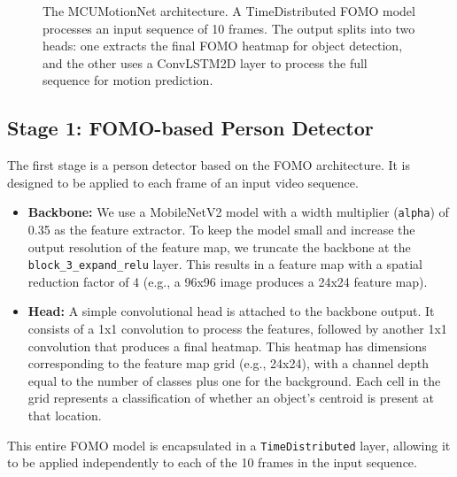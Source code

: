 \documentclass{article}
\begin{document}
\begin{figure}[h!]
{
}
\caption{The MCUMotionNet architecture. A TimeDistributed FOMO model processes an input sequence of 10 frames. The output splits into two heads: one extracts the final FOMO heatmap for object detection, and the other uses a ConvLSTM2D layer to process the full sequence for motion prediction.}
\label{fig:architecture}
\end{figure}

\subsection{Stage 1: FOMO-based Person Detector}
The first stage is a person detector based on the FOMO architecture. It is designed to be applied to each frame of an input video sequence.
\begin{itemize}
    \item \textbf{Backbone:} We use a MobileNetV2 model with a width multiplier (\texttt{alpha}) of 0.35 as the feature extractor. To keep the model small and increase the output resolution of the feature map, we truncate the backbone at the \texttt{block\_3\_expand\_relu} layer. This results in a feature map with a spatial reduction factor of 4 (e.g., a 96x96 image produces a 24x24 feature map).
    \item \textbf{Head:} A simple convolutional head is attached to the backbone output. It consists of a 1x1 convolution to process the features, followed by another 1x1 convolution that produces a final heatmap. This heatmap has dimensions corresponding to the feature map grid (e.g., 24x24), with a channel depth equal to the number of classes plus one for the background. Each cell in the grid represents a classification of whether an object's centroid is present at that location.
\end{itemize}
This entire FOMO model is encapsulated in a \texttt{TimeDistributed} layer, allowing it to be applied independently to each of the 10 frames in the input sequence.
\end{document}
